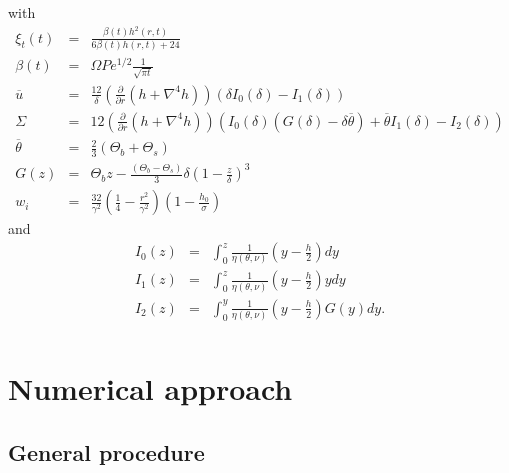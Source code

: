   with
  \begin{eqnarray}
    \xi_t(t)&=&\frac{\beta(t) h^{2}{\left (r,t \right )}}{6 \beta(t) h{\left (r,t \right )}
                + 24}\\
    \beta(t) &=& \Omega Pe^{1/2}\frac{1}{\sqrt{\pi t}}\\
    \overline{u}&=& \frac{12}{\delta}
                    \left( \frac{\partial }{\partial r}\left(h+\nabla^4h\right)\right)\left(\delta
                    I_0(\delta)-I_1(\delta)\right)\\
                    \Sigma     &=&12   \left( \frac{\partial }{\partial r}\left(h+\nabla^4h\right)\right)\left(I_0(\delta)\left(G(\delta)-\delta\overline{\theta}\right)+\overline{\theta}I_1(\delta)-I_2(\delta)\right)\\
    \overline{\theta}                                              &=&
                          \frac{2}{3}\left( \Theta_{b}+\Theta_{s}\right)\\
    G(z)              &    = &                \Theta_b                  z
    -\frac{\left(\Theta_b-\Theta_s\right)}{3}\delta\left(1-\frac{z}{\delta}\right)^3\\
w_i&=&\frac{32}{\gamma^{2}}\left(\frac{1}{4}-\frac{r^{2}}{\gamma^{2}}\right)\left(1-\frac{h_0}{\sigma}\right)
  \end{eqnarray}
and
\begin{eqnarray}
  I_0(z)&=&\int_0^z\frac{1}{\eta(\theta,\nu)}\left(y-\frac{h}{2}\right)
    dy \\
I_1(z) &=& \int_0^z\frac{1}{\eta(\theta,\nu)}\left(y-\frac{h}{2}\right)y dy\\
    I_2(z)&=&\int_0^y                         \frac{1}{\eta(\theta,\nu)}
    \left(y-\frac{h}{2}\right)G(y)dy.\\
\end{eqnarray}


\section{Numerical approach}
\label{C3-sec:numerical-approach}

\subsection{General procedure}
\label{sec:general-procedure}

